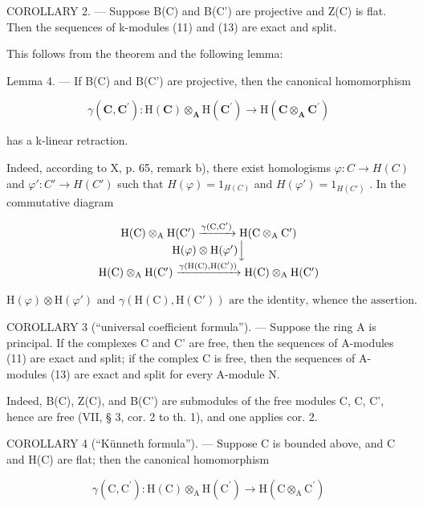 COROLLARY 2. --- Suppose B(C) and B(C') are projective and Z(C) is flat. Then the sequences of k-modules (11) and (13) are exact and split.

This follows from the theorem and the following lemma:

Lemma 4. --- If B(C) and B(C') are projective, then the canonical homomorphism

\[
\gamma (\mathbf {C}, \mathbf {C} ^ {\prime}): \mathrm{H} (\mathbf {C}) \otimes_ {\mathbf {A}} \mathrm{H} (\mathbf {C} ^ {\prime}) \rightarrow \mathrm{H} (\mathbf {C} \otimes_ {\mathbf {A}} \mathbf {C} ^ {\prime})
\]

has a k-linear retraction.

Indeed, according to X, p. 65, remark b), there exist homologisms \(\varphi: C \to H(C)\) and \(\varphi': C' \to H(C')\) such that \(H(\varphi) = 1_{H(C)}\) and \(H(\varphi') = 1_{H(C')}\) . In the commutative diagram

\[
\begin{array}{c} \mathrm{H(C)} \otimes_ {\mathrm{A}} \mathrm {H(C^ {\prime})} \xrightarrow {\gamma (\mathrm{C,C} ^ {\prime})} \mathrm {H(C} \otimes_ {\mathrm{A}} \mathrm {C^ {\prime})} \\ \mathrm {H}(\varphi) \otimes \mathrm {H}(\varphi^ {\prime}) \Big \downarrow \\ \mathrm {H(C)} \otimes_ {\mathrm{A}} \mathrm {H(C^ {\prime})} \xrightarrow {\gamma (\mathrm{H(C),H(C^ {\prime})})} \mathrm {H(C)} \otimes_ {\mathrm{A}} \mathrm {H(C^ {\prime})} \end{array}
\]

\(\mathrm{H}(\varphi) \otimes \mathrm{H}(\varphi') \text{ and } \gamma(\mathrm{H}(\mathrm{C}), \mathrm{H}(\mathrm{C}') ) \text{ are the identity, whence the assertion.}\)

COROLLARY 3 (“universal coefficient formula”). --- Suppose the ring A is principal. If the complexes C and C' are free, then the sequences of A-modules (11) are exact and split; if the complex C is free, then the sequences of A-modules (13) are exact and split for every A-module N.

Indeed, B(C), Z(C), and B(C') are submodules of the free modules C, C, C', hence are free (VII, § 3, cor. 2 to th. 1), and one applies cor. 2.

COROLLARY 4 (“Künneth formula”). --- Suppose C is bounded above, and C and H(C) are flat; then the canonical homomorphism

\[
\gamma (\mathrm{C}, \mathrm{C} ^ {\prime}): \mathrm{H} (\mathrm{C}) \otimes_ {\mathrm{A}} \mathrm{H} (\mathrm{C} ^ {\prime}) \rightarrow \mathrm{H} (\mathrm{C} \otimes_ {\mathrm{A}} \mathrm{C} ^ {\prime})
\]

